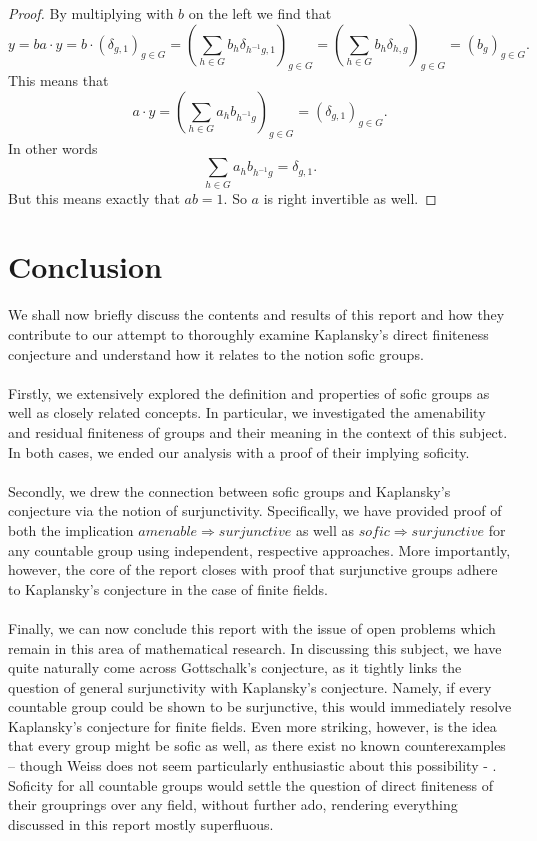 \documentclass[titlepage, a4paper]{article}
\theoremstyle{theoremdd}
\theoremstyle{definition}
\theoremstyle{remark}
\begin{document}
\begin{proof}
		By multiplying with $b$ on the left we find that \[
			 y = ba\cdot y = b\cdot (\delta_{g, 1})_{g \in G} = \left( \sum_{h \in G} b_{h} \delta_{h^{-1}g, 1} \right)_{g \in G} = \left( \sum_{h \in G} b_{h} \delta_{h, g} \right)_{g \in G}
		 = \left( b_{g} \right) _{g \in G}.\] 
		This means that \[
		a\cdot y = \left( \sum_{h \in G} a_h b_{h^{-1}g} \right)_{g \in G} = \left( \delta_{g, 1} \right) _{g \in G} 
	.\] 
	In other words
	\[
	\sum_{h \in G} a_h b_{h^{-1}g} = \delta_{g, 1}
	.\]
	But this means exactly that $ab = 1$. So  $a$ is right invertible as well. 
	\end{proof}	
	
	\section{Conclusion}

We shall now briefly discuss the contents and results of this report and how they contribute to our attempt to thoroughly examine Kaplansky’s direct finiteness conjecture and understand how it relates to the notion sofic groups.\\
\\
Firstly, we extensively explored the definition and properties of sofic  groups as well as closely related concepts. In particular, we investigated the amenability and residual finiteness of groups and their meaning in the context of this subject. In both cases, we ended our analysis with a proof of their implying soficity. \\
\\
Secondly, we drew the connection between sofic groups and Kaplansky’s conjecture via the notion of surjunctivity. Specifically, we have provided proof of both the implication $amenable \Rightarrow surjunctive$ as well as $sofic \Rightarrow surjunctive$ for any countable group using independent, respective approaches. More importantly, however, the core of the report closes with proof that surjunctive groups adhere to Kaplansky’s conjecture in the case of finite fields. \\
\\
Finally, we can now conclude this report with the issue of open problems which remain in this area of mathematical research. In discussing this subject, we have quite naturally come across Gottschalk’s conjecture, as it tightly links the question of general surjunctivity with Kaplansky’s conjecture. Namely, if every countable group could be shown to be surjunctive, this would immediately resolve Kaplansky’s conjecture for finite fields. Even more striking, however, is the idea that every group might be sofic as well, as there exist no known counterexamples – though Weiss does not seem particularly enthusiastic about this possibility \cite[introduction]{weiss_2000} -  . Soficity for all countable groups would settle the question of direct finiteness of their grouprings over any field, without further ado, rendering everything discussed in this report mostly superfluous.
\end{document}
